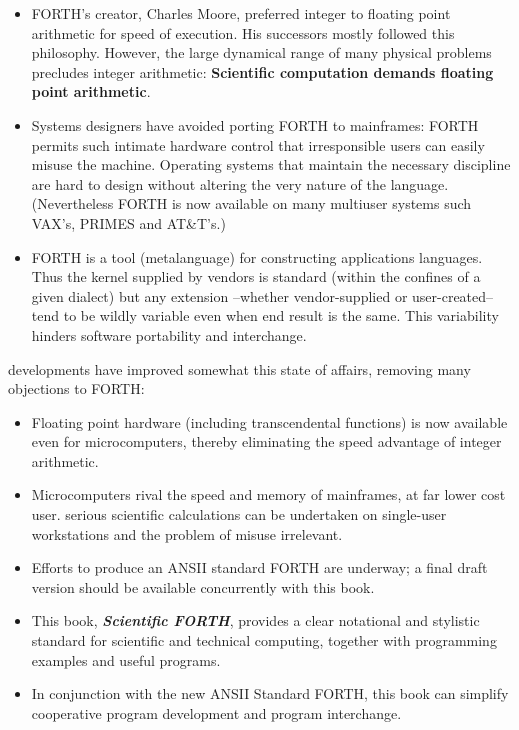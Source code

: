\begin{itemize}
    \item FORTH's creator, Charles Moore, preferred integer to floating point arithmetic for speed of execution. His successors mostly followed this philosophy. However, the large dynamical range of many physical problems precludes integer arithmetic: \textbf{Scientific computation demands floating point arithmetic}.
    \item Systems designers have avoided porting FORTH to mainframes: FORTH permits such intimate hardware control that irresponsible users can easily misuse the machine. Operating systems that maintain the necessary discipline are hard to design without altering the very nature of the language. (Nevertheless FORTH is now available on many multiuser systems such VAX's, PRIMES and AT\&T's.)
    \item FORTH is a tool (metalanguage) for constructing applications languages. Thus the kernel supplied by vendors is standard (within the confines of a given dialect) but any extension --whether vendor-supplied or user-created-- tend to be wildly variable even when end result is the same. This variability hinders software portability and interchange.
\end{itemize}

 developments have improved somewhat this state of affairs, removing many objections to FORTH:

\begin{itemize}
  \item Floating point hardware (including transcendental functions) is now available even for microcomputers, thereby eliminating the speed advantage of integer arithmetic.
  \item Microcomputers rival the speed and memory of mainframes, at far lower cost user. serious scientific calculations can be undertaken on single-user workstations and the problem of misuse irrelevant.
  \item Efforts to produce an ANSII standard FORTH are underway; a final draft version should be available concurrently with this book.
  \item This book, \textbf{\textit{Scientific FORTH}}, provides a clear notational and stylistic standard for scientific and technical computing, together with programming examples and useful programs.
  \item In conjunction with the new ANSII Standard FORTH, this book can simplify cooperative program development and program interchange.
\end{itemize}

